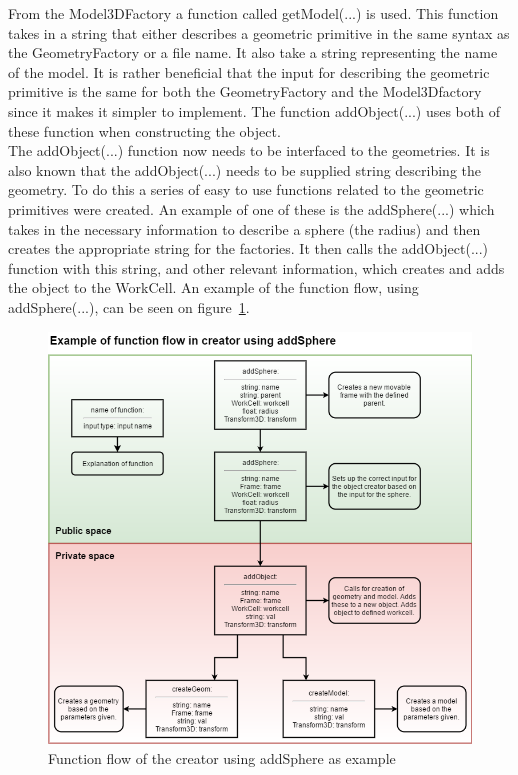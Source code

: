 From the Model3DFactory a function called getModel(...) is used. This function takes in a string that either describes a geometric primitive in the same syntax as the GeometryFactory or a file name. It also take a string representing the name of the model. It is rather beneficial that the input for describing the geometric primitive is the same for both the GeometryFactory and the Model3Dfactory since it makes it simpler to implement. The function addObject(...) uses both of these function when constructing the object.\\

The addObject(...) function now needs to be interfaced to the geometries. It is also known that the addObject(...) needs to be supplied string describing the geometry. To do this a series of easy to use functions related to the geometric primitives were created. An example of one of these is the addSphere(...) which takes in the necessary information to describe a sphere (the radius) and then creates the appropriate string for the factories. It then calls the addObject(...) function with this string, and other relevant information, which creates and adds the object to the WorkCell. An example of the function flow, using addSphere(...), can be seen on figure~\ref{fig:CreatorFlow}.

\begin{figure}[h]
	\centering
	\includegraphics[scale=0.55]{Figures/CreatorFlow.png}
	\caption{Function flow of the creator using addSphere as example}
	\label{fig:CreatorFlow}
\end{figure}
